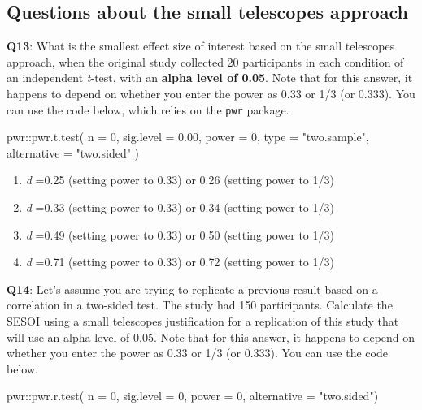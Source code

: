 \documentclass[
  oneside]{book}
\newenvironment{Shaded}{\begin{snugshade}}{\end{snugshade}}
\newcommand{\AttributeTok}[1]{\textcolor[rgb]{0.77,0.63,0.00}{#1}}
\newcommand{\DecValTok}[1]{\textcolor[rgb]{0.00,0.00,0.81}{#1}}
\newcommand{\FloatTok}[1]{\textcolor[rgb]{0.00,0.00,0.81}{#1}}
\newcommand{\FunctionTok}[1]{\textcolor[rgb]{0.00,0.00,0.00}{#1}}
\newcommand{\NormalTok}[1]{#1}
\newcommand{\SpecialCharTok}[1]{\textcolor[rgb]{0.00,0.00,0.00}{#1}}
\newcommand{\StringTok}[1]{\textcolor[rgb]{0.31,0.60,0.02}{#1}}
\providecommand{\tightlist}{%
  \setlength{\itemsep}{0pt}\setlength{\parskip}{0pt}}
\begin{document}
\hypertarget{questions-about-the-small-telescopes-approach}{%
\subsection{Questions about the small telescopes approach}\label{questions-about-the-small-telescopes-approach}}

\textbf{Q13}: What is the smallest effect size of interest based on the small telescopes approach, when the original study collected 20 participants in each condition of an independent \emph{t}-test, with an \textbf{alpha level of 0.05}. Note that for this answer, it happens to depend on whether you enter the power as 0.33 or 1/3 (or 0.333). You can use the code below, which relies on the \texttt{pwr} package.

\begin{Shaded}
\begin{Highlighting}[]
\NormalTok{pwr}\SpecialCharTok{::}\FunctionTok{pwr.t.test}\NormalTok{(}
  \AttributeTok{n =} \DecValTok{0}\NormalTok{, }
  \AttributeTok{sig.level =} \FloatTok{0.00}\NormalTok{, }
  \AttributeTok{power =} \DecValTok{0}\NormalTok{, }
  \AttributeTok{type =} \StringTok{"two.sample"}\NormalTok{,}
  \AttributeTok{alternative =} \StringTok{"two.sided"}
\NormalTok{)}
\end{Highlighting}
\end{Shaded}

\begin{enumerate}
\def\labelenumi{\Alph{enumi})}
\tightlist
\item
  \emph{d} =0.25 (setting power to 0.33) or 0.26 (setting power to 1/3)
\item
  \emph{d} =0.33 (setting power to 0.33) or 0.34 (setting power to 1/3)
\item
  \emph{d} =0.49 (setting power to 0.33) or 0.50 (setting power to 1/3)
\item
  \emph{d} =0.71 (setting power to 0.33) or 0.72 (setting power to 1/3)
\end{enumerate}

\textbf{Q14}: Let's assume you are trying to replicate a previous result based on a correlation in a two-sided test. The study had 150 participants. Calculate the SESOI using a small telescopes justification for a replication of this study that will use an alpha level of 0.05. Note that for this answer, it happens to depend on whether you enter the power as 0.33 or 1/3 (or 0.333). You can use the code below.

\begin{Shaded}
\begin{Highlighting}[]
\NormalTok{pwr}\SpecialCharTok{::}\FunctionTok{pwr.r.test}\NormalTok{(}
  \AttributeTok{n =} \DecValTok{0}\NormalTok{, }
  \AttributeTok{sig.level =} \DecValTok{0}\NormalTok{, }
  \AttributeTok{power =} \DecValTok{0}\NormalTok{, }
  \AttributeTok{alternative =} \StringTok{"two.sided"}\NormalTok{)}
\end{Highlighting}
\end{Shaded}
\end{document}
